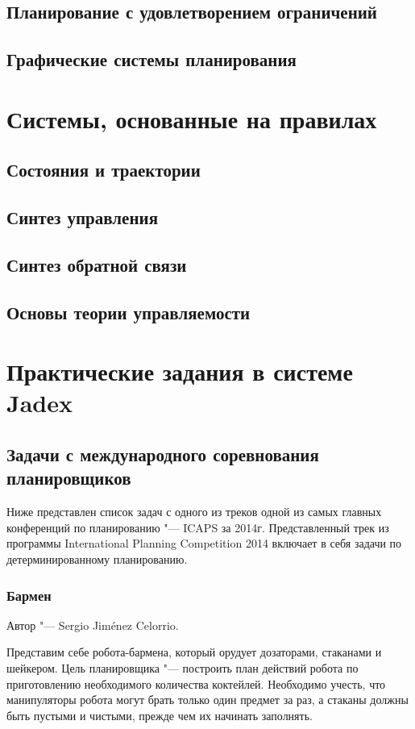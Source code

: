 \documentclass[b5paper,11pt]{book}
\begin{document}
	\section{Планирование с удовлетворением ограничений}
	\section{Графические системы планирования}
		
		
	
	\chapter{Системы, основанные на правилах}
	
	\section{Состояния и траектории}
	\section{Синтез управления}
	\section{Синтез обратной связи}
	\section{Основы теории управляемости}
	


	\chapter{Практические задания в системе Jadex}
	\section{Задачи с международного соревнования планировщиков}
	Ниже представлен список задач с одного из треков одной из самых главных конференций по планированию "--- ICAPS за 2014г. Представленный трек из программы International Planning Competition 2014 включает в себя задачи по детерминированному планированию.
	\subsection{Бармен}
	Автор "--- Sergio Jiménez Celorrio.
	
	Представим себе робота-бармена, который орудует дозаторами, стаканами и шейкером. Цель планировщика "--- построить план действий робота по приготовлению необходимого количества коктейлей. Необходимо учесть, что манипуляторы робота могут брать только один предмет за раз, а стаканы должны быть пустыми и чистыми, прежде чем их начинать заполнять.
\end{document}
